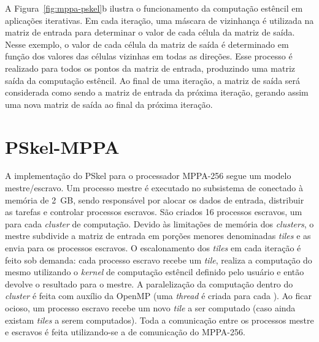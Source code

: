 \documentclass[12pt]{article}
\newcommand{\pskel}{{\small \textsf{PSkel}}\xspace}
\newcommand{\mppa}{{\small \textsf{MPPA-256}}\xspace}
\begin{document}
A Figura~\ref{fig:mppa-pskel}b ilustra o funcionamento da computação estêncil em aplicações iterativas. Em cada iteração, uma máscara de vizinhança é utilizada na matriz de entrada para determinar o valor de cada célula da matriz de saída. Nesse exemplo, o valor de cada célula da matriz de saída é determinado em função dos valores das células vizinhas em todas as direções. Esse processo é realizado para todos os pontos da matriz de entrada, produzindo uma matriz saída da computação estêncil. Ao final de uma iteração, a matriz de saída será considerada como sendo a matriz de entrada da próxima iteração, gerando assim uma nova matriz de saída ao final da próxima iteração.

\section{PSkel-MPPA}
\label{sec:pskelMPPA}

A implementação do \pskel para o processador \mppa segue um modelo mestre/escravo. Um processo mestre é executado no subsistema de \io conectado à memória \lpddr de 2~GB, sendo responsável por alocar os dados de entrada, distribuir as tarefas e controlar processos escravos. São criados 16 processos escravos, um para cada \textit{cluster} de computação. Devido às limitações de memória dos \textit{clusters}, o mestre subdivide a matriz de entrada em porções menores denominadas \textit{tiles} e as envia para os processos escravos. O escalonamento dos \textit{tiles} em cada iteração é feito sob demanda: cada processo escravo recebe um \textit{tile}, realiza a computação do mesmo utilizando o \textit{kernel} de computação estêncil definido pelo usuário e então devolve o resultado para o mestre. A paralelização da computação dentro do \textit{cluster} é feita com auxílio da \api OpenMP (uma \textit{thread} é criada para cada \pe). Ao ficar ocioso, um processo escravo recebe um novo \textit{tile} a ser computado (caso ainda existam \textit{tiles} a serem computados). Toda a comunicação entre os processos mestre e escravos é feita utilizando-se a \api de comunicação do \mppa. 
\end{document}
